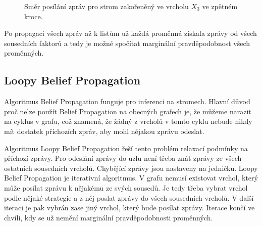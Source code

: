 \begin{figure}[H]
\begin{center}
\end{center}
\caption{Směr posílání zpráv pro strom zakořeněný ve vrcholu $X_3$ ve zpětném kroce.}
\end{figure}

Po propagaci všech zpráv až k listům už každá proměnná získala zprávy od všech sousedních faktorů a tedy je možné spočítat marginální pravděpodobnost všech proměnných.

\subsection{Loopy Belief Propagation}
\label{sec:lbp}

Algoritmus Belief Propagation funguje pro inferenci na stromech.
Hlavní důvod proč nelze použít Belief Propagation na obecných grafech je, že můžeme narazit na cyklus v grafu, což znamená, že žádný z vrcholů v tomto cyklu nebude nikdy mít dostatek příchozích zpráv, aby mohl nějakou zprávu odeslat.

Algoritmus Loopy Belief Propagation řeší tento problém relaxací podmínky na příchozí zprávy.
Pro odeslání zprávy do uzlu není třeba znát zprávy ze všech ostatních sousedních vrcholů.
Chybějící zprávy jsou nastaveny na jedničku.
Loopy Belief Propagation je iterativní algoritmus.
V grafu nemusí existovat vrchol, který může posílat zprávu k nějakému ze svých sousedů.
Je tedy třeba vybrat vrchol podle nějaké strategie a z něj poslat zprávy do všech sousedních vrcholů.
V další iteraci je pak vybrán zase jiný vrchol, který bude posílat zprávy.
Iterace končí ve chvíli, kdy se už nemění marginální pravděpodobnosti proměnných.

